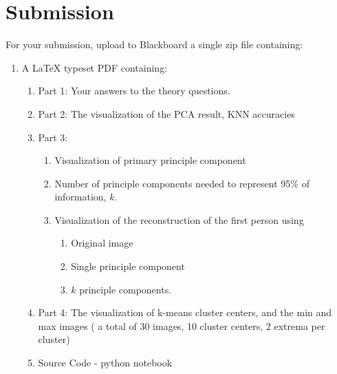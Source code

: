 \documentclass[12pt]{article}
\begin{document}
%


\newpage
\section*{Submission}
For your submission, upload to Blackboard a single zip file containing:

\begin{enumerate}
\item A LaTeX typeset PDF containing:
\begin{enumerate}
\item Part 1: Your answers to the theory questions.
\item Part 2: The visualization of the PCA result, KNN accuracies
\item Part 3:
	\begin{enumerate}
	\item Visualization of primary principle component
		\item Number of principle components needed to represent 95\% of information, $k$.
	\item Visualization of the reconstruction of the first person using 
		\begin{enumerate}
		\item Original image
		\item Single principle component
		\item $k$ principle components.
		\end{enumerate}
	\end{enumerate}

\item Part 4: The visualization of k-means cluster centers, and the min and max images ( a total of 30 images, 10 cluster centers, 2 extrema per cluster)

\item Source Code - python notebook 
\end{enumerate}
\end{enumerate}
\end{document}
